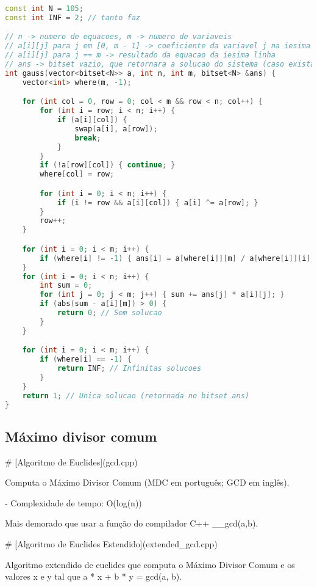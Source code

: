 \documentclass[11pt, a4paper, twoside]{article}
\begin{document}
\begin{lstlisting}[language=C++]
const int N = 105;
const int INF = 2; // tanto faz

// n -> numero de equacoes, m -> numero de variaveis
// a[i][j] para j em [0, m - 1] -> coeficiente da variavel j na iesima equacao
// a[i][j] para j == m -> resultado da equacao da iesima linha
// ans -> bitset vazio, que retornara a solucao do sistema (caso exista)
int gauss(vector<bitset<N>> a, int n, int m, bitset<N> &ans) {
    vector<int> where(m, -1);

    for (int col = 0, row = 0; col < m && row < n; col++) {
        for (int i = row; i < n; i++) {
            if (a[i][col]) {
                swap(a[i], a[row]);
                break;
            }
        }
        if (!a[row][col]) { continue; }
        where[col] = row;

        for (int i = 0; i < n; i++) {
            if (i != row && a[i][col]) { a[i] ^= a[row]; }
        }
        row++;
    }

    for (int i = 0; i < m; i++) {
        if (where[i] != -1) { ans[i] = a[where[i]][m] / a[where[i]][i]; }
    }
    for (int i = 0; i < n; i++) {
        int sum = 0;
        for (int j = 0; j < m; j++) { sum += ans[j] * a[i][j]; }
        if (abs(sum - a[i][m]) > 0) {
            return 0; // Sem solucao
        }
    }

    for (int i = 0; i < m; i++) {
        if (where[i] == -1) {
            return INF; // Infinitas solucoes
        }
    }
    return 1; // Unica solucao (retornada no bitset ans)
}
\end{lstlisting}

\subsection{Máximo divisor comum}



\# [Algoritmo de Euclides](gcd.cpp)

Computa o Máximo Divisor Comum (MDC em português; GCD em inglês).

- Complexidade de tempo: O(log(n))

Mais demorado que usar a função do compilador C++ \_\_gcd(a,b).

\# [Algoritmo de Euclides Estendido](extended\_gcd.cpp)

Algoritmo extendido de euclides que computa o Máximo Divisor Comum e os valores x e y tal que a * x + b * y = gcd(a, b).
\end{document}
